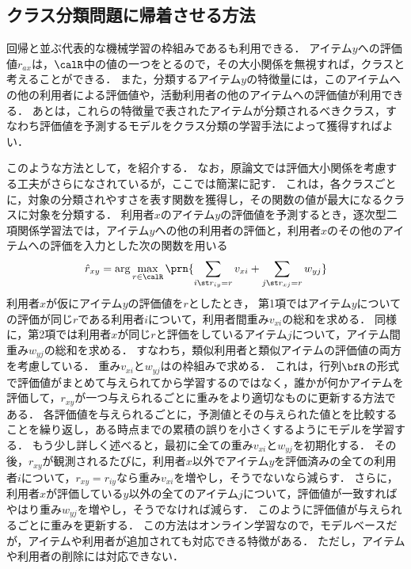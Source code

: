 \subsection{クラス分類問題に帰着させる方法}

回帰と並ぶ代表的な機械学習の枠組みであるも利用できる．
アイテム$y$への評価値$r_{ax}$は，$\calR$中の値の一つをとるので，その大小関係を無視すれば，クラスと考えることができる．
また，分類するアイテム$y$の特徴量には，このアイテムへの他の利用者による評価値や，活動利用者の他のアイテムへの評価値が利用できる．
あとは，これらの特徴量で表されたアイテムが分類されるべきクラス，すなわち評価値を予測するモデルをクラス分類の学習手法によって獲得すればよい．

このような方法として，\cite{icml:98:01,jb:032:04}を紹介する．
なお，原論文では評価大小関係を考慮する工夫がさらになされているが，ここでは簡潔に記す．
これは，各クラスごとに，対象の分類されやすさを表す関数を獲得し，その関数の値が最大になるクラスに対象を分類する．
利用者$x$のアイテム$y$の評価値を予測するとき，逐次型二項関係学習法では，アイテム$y$への他の利用者の評価と，利用者$x$のその他のアイテムへの評価を入力とした次の関数を用いる
\begin{equation}
\hat{r}_{xy}=\arg\max_{r\in \calR}
\prn{\sum_{i\st r_{iy}=r}v_{xi}+\sum_{j\st r_{xj}=r}w_{yj}}
\label{eq:cglr}
\end{equation}
利用者$x$が仮にアイテム$y$の評価値を$r$としたとき，
第1項ではアイテム$y$についての評価が同じ$r$である利用者$i$について，利用者間重み$v_{xi}$の総和を求める．
同様に，第2項では利用者$x$が同じ$r$と評価をしているアイテム$j$について，アイテム間重み$w_{yj}$の総和を求める．
すなわち，類似利用者と類似アイテムの評価値の両方を考慮している．
重み$v_{xi}$と$w_{yj}$は\cite{jjsai:99:02}の枠組みで求める．
これは，行列$\bfR$の形式で評価値がまとめて与えられてから学習するのではなく，誰かが何かアイテムを評価して，$r_{xy}$が一つ与えられるごとに重みをより適切なものに更新する方法である．
各評価値を与えられるごとに，予測値とその与えられた値とを比較することを繰り返し，ある時点までの累積の誤りを小さくするようにモデルを学習する．
もう少し詳しく述べると，最初に全ての重み$v_{xi}$と$w_{yj}$を初期化する．
その後，$r_{xy}$が観測されるたびに，利用者$x$以外でアイテム$y$を評価済みの全ての利用者$i$について，$r_{xy}=r_{iy}$なら重み$v_{xi}$を増やし，そうでないなら減らす．
さらに，利用者$x$が評価している$y$以外の全てのアイテム$j$について，評価値が一致すればやはり重み$w_{yj}$を増やし，そうでなければ減らす．
このように評価値が与えられるごとに重みを更新する．
この方法はオンライン学習なので，モデルベースだが，アイテムや利用者が追加されても対応できる特徴がある．
ただし，アイテムや利用者の削除には対応できない．

